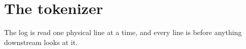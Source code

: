 \section{The tokenizer}

The log is read one physical line at a time, and every line is 
before anything downstream looks at it.
